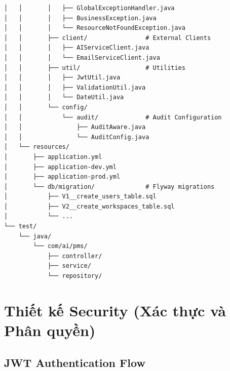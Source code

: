 \documentclass[12pt,a4paper]{report}
\begin{document}
\begin{verbatim}
│   │       │   ├── GlobalExceptionHandler.java
│   │       │   ├── BusinessException.java
│   │       │   └── ResourceNotFoundException.java
│   │       ├── client/                # External Clients
│   │       │   ├── AIServiceClient.java
│   │       │   └── EmailServiceClient.java
│   │       ├── util/                  # Utilities
│   │       │   ├── JwtUtil.java
│   │       │   ├── ValidationUtil.java
│   │       │   └── DateUtil.java
│   │       └── config/
│   │           └── audit/             # Audit Configuration
│   │               ├── AuditAware.java
│   │               └── AuditConfig.java
│   └── resources/
│       ├── application.yml
│       ├── application-dev.yml
│       ├── application-prod.yml
│       └── db/migration/              # Flyway migrations
│           ├── V1__create_users_table.sql
│           ├── V2__create_workspaces_table.sql
│           └── ...
└── test/
    └── java/
        └── com/ai/pms/
            ├── controller/
            ├── service/
            └── repository/
\end{verbatim}

\section{Thiết kế Security (Xác thực và Phân quyền)}

\subsection{JWT Authentication Flow}
\end{document}

